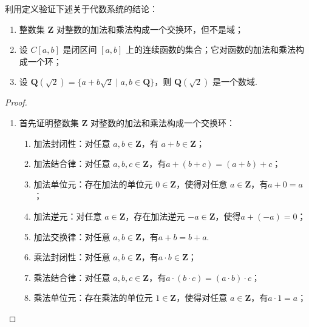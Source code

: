 \begin{example}{}{}
    利用定义验证下述关于代数系统的结论：
    \begin{enumerate}
        \item 整数集 $\mathbf{Z}$ 对整数的加法和乘法构成一个交换环，但不是域；

        \item 设 $C[a,b]$ 是闭区间 $[a,b]$ 上的连续函数的集合；它对函数的加法和乘法构成一个环；

        \item 设 $\mathbf{Q}(\sqrt{2})=\{a + b\sqrt{2} \mid a, b \in \mathbf{Q}\}$，则 $\mathbf{Q}(\sqrt{2})$ 是一个数域.
    \end{enumerate}
\end{example}

\begin{proof}
\begin{enumerate}
    \item 首先证明整数集 $\mathbf{Z}$ 对整数的加法和乘法构成一个交换环：
    \begin{enumerate}
        \item 加法封闭性：对任意 $a, b \in \mathbf{Z}$，有
        $a + b \in \mathbf{Z}$；

        \item 加法结合律：对任意 $a, b, c \in \mathbf{Z}$，有$a + (b + c) = (a + b) + c$；

        \item 加法单位元：存在加法的单位元 $0 \in \mathbf{Z}$，使得对任意 $a \in \mathbf{Z}$，有$a + 0 = a$；

        \item 加法逆元：对任意 $a \in \mathbf{Z}$，存在加法逆元 $-a \in \mathbf{Z}$，使得$ a + (-a) = 0$；

        \item 加法交换律：对任意 $a, b \in \mathbf{Z}$，有$a + b = b + a$.

        \item 乘法封闭性：对任意 $a, b \in \mathbf{Z}$，有$a \cdot b \in \mathbf{Z}$；

        \item 乘法结合律：对任意 $a, b, c \in \mathbf{Z}$，有$a \cdot (b \cdot c) = (a \cdot b) \cdot c$；

        \item 乘法单位元：存在乘法的单位元 $1 \in \mathbf{Z}$，使得对任意 $a \in \mathbf{Z}$，有$a \cdot 1 = a$；


\end{enumerate}
\end{enumerate}
\end{proof}
